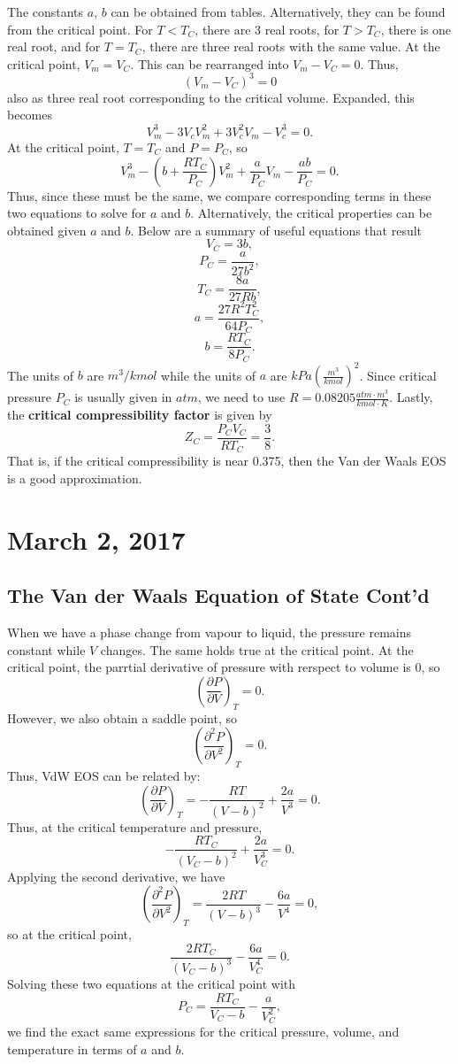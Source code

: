 \documentclass[11pt]{article}
\theoremstyle{plain} %
\theoremstyle{definition}
\theoremstyle{example}
\theoremstyle{remark}
\begin{document}
The constants $a$, $b$ can be obtained from tables. Alternatively, they can be found from the critical point. For $T<T_C$, there are 3 real roots, for $T>T_C$, there is one real root, and for $T = T_C$, there are three real roots with the same value. At the critical point, $V_m=V_C$. This can be rearranged into $V_m -V_C=0$. Thus,
$$(V_m-V_C)^3=0$$
also as three real root corresponding to the critical volume. Expanded, this becomes 
$$V_m^3-3V_cV_m^2 + 3V_c^2V_m -V_c^3=0.$$
At the critical point, $T = T_C$ and $P = P_C$, so 
$$V_m^3-\left(b+\frac{RT_C}{P_C}\right)V_m^2+\frac{a}{P_C}V_m-\frac{ab}{P_C} = 0.$$
Thus, since these must be the same, we compare corresponding terms in these two equations to solve for $a$ and $b$. Alternatively, the critical properties can be obtained given $a$ and $b$. Below are a summary of useful equations that result 
 $$V_C = 3b,$$
 $$P_C = \frac{a}{27b^2},$$
 $$T_C = \frac{8a}{27Rb},$$
$$a = \frac{27R^2T_C^2}{64P_C},$$
$$b = \frac{RT_C}{8P_C}.$$
The units of $b$ are $m^3/kmol$ while the units of $a$ are $kPa\left(\frac{m^3}{kmol}\right)^2$. Since critical pressure $P_C$ is usually given in $atm$, we need to use $R = 0.08205 \frac{atm\cdot m^3}{kmol\cdot K}$. Lastly, the \textbf{critical compressibility factor} is given by
$$Z_C = \frac{P_CV_C}{RT_C} = \frac{3}{8}.$$
That is, if the critical compressibility is near 0.375, then the Van der Waals EOS is a good approximation. 
	
\section{March 2, 2017}
\subsection{The Van der Waals Equation of State Cont'd}

When we have a phase change from vapour to liquid, the pressure remains constant while $V$ changes. The same holds true at the critical point. At the critical point, the parrtial derivative of pressure with rerspect to volume is 0, so 
$$\left(\frac{\partial P}{\partial V}\right)_T = 0.$$
However, we also obtain a saddle point, so 
$$\left(\frac{\partial^2 P}{\partial V^2}\right)_T = 0.$$
Thus, VdW EOS can be related by:
$$\left(\frac{\partial P}{\partial V}\right)_T =-\frac{RT}{(V-b)^2}+\frac{2a}{V^3}=0.$$
Thus, at the critical temperature and pressure, 
	$$-\frac{RT_C}{(V_C-b)^2}+\frac{2a}{V_C^3}=0.$$
	Applying the second derivative, we have 
$$\left(\frac{\partial^2 P}{\partial V^2}\right)_T = \frac{2RT}{(V-b)^3}-\frac{6a}{V^4} = 0,$$
so at the critical point, 
$$\frac{2RT_C}{(V_C-b)^3}-\frac{6a}{V_C^4} = 0.$$
Solving these two equations at the critical point with $$P_C = \frac{RT_C}{V_C-b}-\frac{a}{V_C^2},$$
we find the exact same expressions for the critical pressure, volume, and temperature in terms of $a$ and $b$. 
\end{document}
